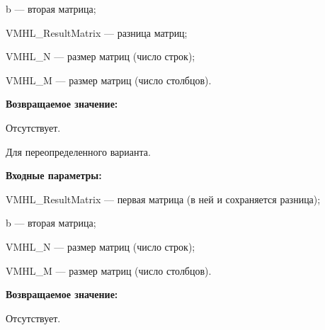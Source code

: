 \documentclass[a4paper,12pt]{article}
\begin{document}
 b --- вторая матрица;
 
 VMHL\_ResultMatrix --- разница матриц;
 
 VMHL\_N --- размер матриц (число строк);
 
 VMHL\_M --- размер матриц (число столбцов).

\textbf{Возвращаемое значение:}

Отсутствует.

Для переопределенного варианта.

\textbf{Входные параметры:}

 VMHL\_ResultMatrix --- первая матрица (в ней и сохраняется разница);
 
 b --- вторая матрица;
 
 VMHL\_N --- размер матриц (число строк);
 
 VMHL\_M --- размер матриц (число столбцов).
 
 \textbf{Возвращаемое значение:}

Отсутствует.
\end{document}
